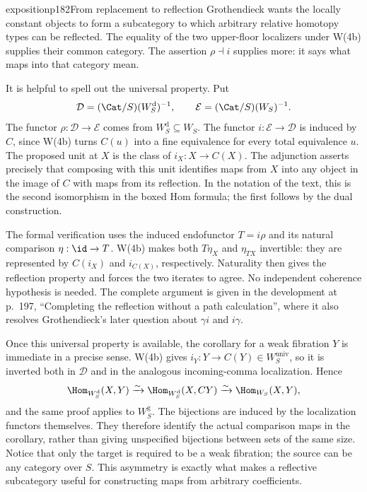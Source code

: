 \begin{dcomment}{exposition}{p182}{From replacement to reflection}
Grothendieck wants the locally constant objects to form a subcategory to which arbitrary relative homotopy types can be reflected. The equality of the two upper-floor localizers under W(4b) supplies their common category. The assertion $\rho\dashv i$ supplies more: it says what maps into that category mean.

It is helpful to spell out the universal property. Put
\[
 \mathcal D=(\Cat/S)(W_S^{\mathrm d})^{-1},\qquad
 \mathcal E=(\Cat/S)(W_S)^{-1}.
\]
The functor $\rho:\mathcal D\to\mathcal E$ comes from $W_S^{\mathrm d}\subseteq W_S$. The functor $i:\mathcal E\to\mathcal D$ is induced by $C$, since W(4b) turns $C(u)$ into a fine equivalence for every total equivalence $u$. The proposed unit at $X$ is the class of $i_X:X\to C(X)$. The adjunction asserts precisely that composing with this unit identifies maps from $X$ into any object in the image of $C$ with maps from its reflection. In the notation of the text, this is the second isomorphism in the boxed Hom formula; the first follows by the dual construction.

The formal verification uses the induced endofunctor $T=i\rho$ and its natural comparison $\eta:\id\to T$. W(4b) makes both $T\eta_X$ and $\eta_{TX}$ invertible: they are represented by $C(i_X)$ and $i_{C(X)}$, respectively. Naturality then gives the reflection property and forces the two iterates to agree. No independent coherence hypothesis is needed. The complete argument is given in the development at p.~197, ``Completing the reflection without a path calculation'', where it also resolves Grothendieck's later question about $\gamma i$ and $i\gamma$.

Once this universal property is available, the corollary for a weak fibration $Y$ is immediate in a precise sense. W(4b) gives $i_Y:Y\to C(Y)\in W_S^{\mathrm{univ}}$, so it is inverted both in $\mathcal D$ and in the analogous incoming-comma localization. Hence
\[
 \Hom_{W_S^{\mathrm d}}(X,Y)
 \xrightarrow{\sim}\Hom_{W_S^{\mathrm d}}(X,CY)
 \xrightarrow{\sim}\Hom_{W_S}(X,Y),
\]
and the same proof applies to $W_S^{\mathrm g}$. The bijections are induced by the localization functors themselves. They therefore identify the actual comparison maps in the corollary, rather than giving unspecified bijections between sets of the same size. Notice that only the target is required to be a weak fibration; the source can be any category over $S$. This asymmetry is exactly what makes a reflective subcategory useful for constructing maps from arbitrary coefficients.
\end{dcomment}

